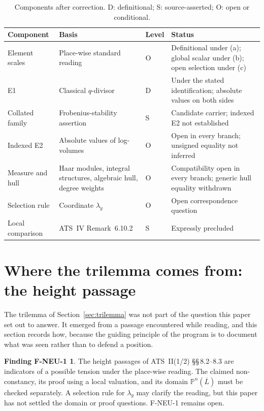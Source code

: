 \documentclass[11pt,a4paper]{article}
\theoremstyle{definition}
\theoremstyle{plain}
\theoremstyle{definition}
\newtheorem*{findingF}{Finding F-NEU-1}
\begin{document}
\begin{table}[htbp]
\centering
\caption{Components after correction. D: definitional; S: source-asserted;
O: open or conditional.}
\label{tab:resolution}
\small
\begin{tabular}{@{}P{0.23\textwidth}P{0.27\textwidth}P{0.08\textwidth}P{0.29\textwidth}@{}}
\toprule
Component & Basis & Level & Status \\
\midrule
Element scales & Place-wise standard reading & O
 & Definitional under (a); global scalar under (b); open selection under (c) \\[3pt]
E1 & Classical $q$-divisor & D
 & Under the stated identification; absolute values on both sides \\[3pt]
Collated family & Frobenius-stability assertion & S
 & Candidate carrier; indexed E2 not established \\[3pt]
Indexed E2 & Absolute values of log-volumes & O
 & Open in every branch; unsigned equality not inferred \\[3pt]
Measure and hull & Haar modules, integral structures, algebraic hull, degree weights & O
 & Compatibility open in every branch; generic hull equality withdrawn \\[3pt]
Selection rule & Coordinate $\lambda_y$ & O
 & Open correspondence question \\[3pt]
Local comparison & ATS~IV Remark~6.10.2 & S
 & Expressly precluded \\
\bottomrule
\end{tabular}
\end{table}

\section{Where the trilemma comes from: the height passage}
\label{sec:fneu}

The trilemma of Section~\ref{sec:trilemma} was not part of the question this paper
set out to answer. It emerged from a passage encountered while reading, and this
section records how, because the guiding principle of the program is to document
what was seen rather than to defend a position.

\begin{findingF}
The height passages of ATS~II(1/2) \S\S\,8.2--8.3 are indicators of a
possible tension under the place-wise reading. The claimed non-constancy,
its proof using a local valuation, and its domain $\mathbb P^n(\overline L)$
must be checked separately. A selection rule for $\lambda_y$ may clarify
the reading, but this paper has not settled the domain or proof questions.
F-NEU-1 remains open.
\end{findingF}
\end{document}

